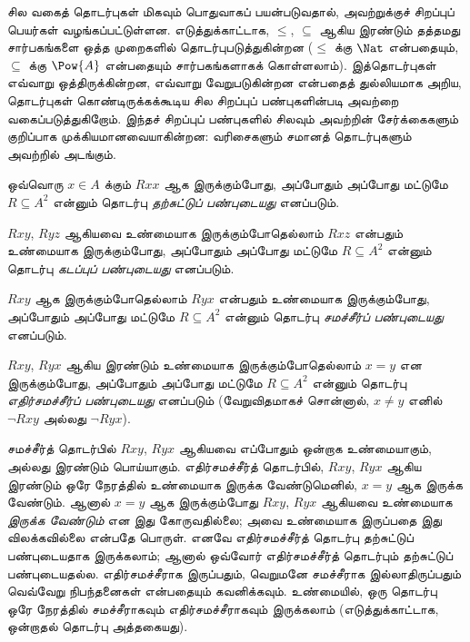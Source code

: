 \documentclass[../../../include/open-logic-section]{subfiles}
\begin{document}

\begin{intro}
சில வகைத் தொடர்புகள் மிகவும் பொதுவாகப் பயன்படுவதால்,
அவற்றுக்குச் சிறப்புப் பெயர்கள் வழங்கப்பட்டுள்ளன.
எடுத்துக்காட்டாக, $\le$, $\subseteq$ ஆகிய இரண்டும் தத்தமது
சார்பகங்களை ஒத்த முறைகளில் தொடர்புபடுத்துகின்றன
($\le$ க்கு $\Nat$ என்பதையும், $\subseteq$ க்கு $\Pow{A}$ என்பதையும்
சார்பகங்களாகக் கொள்ளலாம்).
இத்தொடர்புகள் எவ்வாறு ஒத்திருக்கின்றன, எவ்வாறு வேறுபடுகின்றன என்பதைத்
துல்லியமாக அறிய, தொடர்புகள் கொண்டிருக்கக்கூடிய சில சிறப்புப் பண்புகளின்படி
அவற்றை வகைப்படுத்துகிறோம். இந்தச் சிறப்புப் பண்புகளில் சிலவும் அவற்றின்
சேர்க்கைகளும் குறிப்பாக முக்கியமானவையாகின்றன:
வரிசைகளும் சமானத் தொடர்புகளும் அவற்றில் அடங்கும்.
\end{intro}

\begin{defn}[தற்சுட்டுப் பண்பு]
ஒவ்வொரு $x \in A$ க்கும் $Rxx$ ஆக இருக்கும்போது,
அப்போதும் அப்போது மட்டுமே $R \subseteq A^2$ என்னும் தொடர்பு
\emph{தற்சுட்டுப் பண்புடையது} எனப்படும்.
\end{defn}

\begin{defn}[கடப்புப் பண்பு]
$Rxy$, $Ryz$ ஆகியவை உண்மையாக இருக்கும்போதெல்லாம் $Rxz$ என்பதும்
உண்மையாக இருக்கும்போது, அப்போதும் அப்போது மட்டுமே
$R \subseteq A^2$ என்னும் தொடர்பு \emph{கடப்புப் பண்புடையது} எனப்படும்.
\end{defn}

\begin{defn}[சமச்சீர்ப் பண்பு]
$Rxy$ ஆக இருக்கும்போதெல்லாம் $Ryx$ என்பதும் உண்மையாக இருக்கும்போது,
அப்போதும் அப்போது மட்டுமே $R \subseteq A^2$ என்னும் தொடர்பு
\emph{சமச்சீர்ப் பண்புடையது} எனப்படும்.
\end{defn}

\begin{defn}[எதிர்சமச்சீர்ப் பண்பு]
$Rxy$, $Ryx$ ஆகிய இரண்டும் உண்மையாக இருக்கும்போதெல்லாம் $x=y$
என இருக்கும்போது, அப்போதும் அப்போது மட்டுமே $R \subseteq A^2$
என்னும் தொடர்பு \emph{எதிர்\-சமச்\-சீர்ப் பண்புடையது} எனப்படும்
(வேறுவிதமாகச் சொன்னால், $x\neq y$ எனில் $\lnot Rxy$ அல்லது $\lnot Ryx$).
\end{defn}

\begin{explain}
சமச்சீர்த் தொடர்பில் $Rxy$, $Ryx$ ஆகியவை எப்போதும் ஒன்றாக உண்மையாகும்,
அல்லது இரண்டும் பொய்யாகும். எதிர்சமச்சீர்த் தொடர்பில்,
$Rxy$, $Ryx$ ஆகிய இரண்டும் ஒரே நேரத்தில் உண்மையாக இருக்க வேண்டுமெனில்,
$x = y$ ஆக இருக்க வேண்டும்.
ஆனால் $x = y$ ஆக இருக்கும்போது $Rxy$, $Ryx$ ஆகியவை உண்மையாக
\emph{இருக்க வேண்டும்} என இது கோருவதில்லை;
அவை உண்மையாக இருப்பதை இது விலக்கவில்லை என்பதே பொருள்.
எனவே எதிர்சமச்சீர்த் தொடர்பு தற்சுட்டுப் பண்புடையதாக இருக்கலாம்;
ஆனால் ஒவ்வோர் எதிர்சமச்சீர்த் தொடர்பும் தற்சுட்டுப் பண்புடையதல்ல.
எதிர்சமச்சீராக இருப்பதும், வெறுமனே சமச்சீராக இல்லாதிருப்பதும்
வெவ்வேறு நிபந்தனைகள் என்பதையும் கவனிக்கவும்.
உண்மையில், ஒரு தொடர்பு ஒரே நேரத்தில் சமச்சீராகவும் எதிர்சமச்சீராகவும்
இருக்கலாம் (எடுத்துக்காட்டாக, ஒன்றாதல் தொடர்பு அத்தகையது).
\end{explain}
\end{document}
